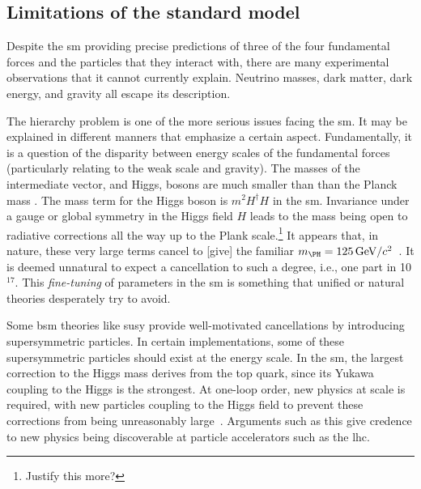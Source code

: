 \subsection{Limitations of the standard model}
\label{subsec:sm_limitations}


Despite the \acrlong{sm} providing precise predictions of three of the four fundamental forces and the particles that they interact with, there are many experimental observations that it cannot currently explain. Neutrino masses, dark matter, dark energy, and gravity all escape its description.

The hierarchy problem is one of the more serious issues facing the \acrlong{sm}. It may be explained in different manners that emphasize a certain aspect. Fundamentally, it is a question of the disparity between energy scales of the fundamental forces (particularly relating to the weak scale and gravity). The masses of the intermediate vector, and Higgs, bosons  are much smaller than than the Planck mass . The mass term for the Higgs boson is $m^2 H^{\dagger} H$ in the \acrshort{sm}. Invariance under a gauge or global symmetry in the Higgs field $H$ leads to the mass being open to radiative corrections all the way up to the Plank scale.\footnote{Justify this more?} It appears that, in nature, these very large terms cancel to [give] the familiar $m_{\PH} = \text{125}\GeV/c^2$~\cite{Chatrchyan:2012xdj,Aad:2012tfa}. It is deemed unnatural to expect a cancellation to such a degree, i.e., one part in 10$^{17}$. This \emph{fine-tuning} of parameters in the \acrlong{sm} is something that unified or natural theories desperately try to avoid.

Some \acrshort{bsm} theories like \acrlong{susy} provide well-motivated cancellations by introducing supersymmetric particles. In certain implementations, some of these supersymmetric particles should exist at the \tTeV energy scale. In the \acrshort{sm}, the largest correction to the Higgs mass derives from the top quark, since its Yukawa coupling to the Higgs is the strongest. At one-loop order, new physics at \OrderOf{\tTeV} scale is required, with new particles coupling to the Higgs field to prevent these corrections from being unreasonably large~\cite{Farina:2013ssa}. Arguments such as this give credence to new physics being discoverable at particle accelerators such as the \acrlong{lhc}.


